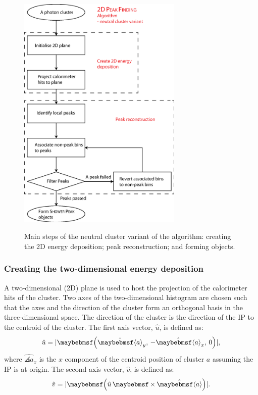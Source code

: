 \begin{figure}[tbph]
\centering
{\includegraphics[width=0.7\textwidth]{photon/2DpeakFinding5}}
\caption[Flow chart for \peakFinding algorithm neutral cluster variant.]
{Main steps of the  neutral cluster variant of the \peakFinding algorithm: creating the 2D energy deposition; peak reconstruction; and forming \ShowerPeak objects.}
\label{fig:photonPeakFindingFlowNeutral}
\end{figure}

\subsubsection{Creating the two-dimensional energy deposition}

A two-dimensional (2D) plane is used to host the projection of the calorimeter hits of the cluster.  Two axes of the two-dimensional histogram are chosen such that the axes and the direction of the cluster form an orthogonal basis  in the three-dimensional space. The direction of the cluster is the direction of the IP to the centroid of the cluster. The first axis vector, $\hat{u}$,  is defined as:
\begin{equation}
\hat{u} = |\parenths{\hat{\angles{a}}_y,\, - \hat{\angles{a}}_x,\,0}|,
\end{equation}
where $ \hat{\angles{a}}_x$ is the $x$ component of the centroid position of cluster $a$ assuming the IP is at origin. The second axis vector, $\hat{v}$, is defined as:
\begin{equation}
\hat{v} = |\parenths{\hat{u}\, \times \hat{\angles{a}}}|.
\end{equation}

